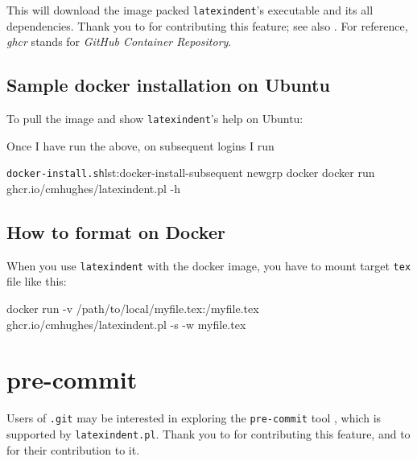 \documentclass[10pt]{article}
\begin{document}
  This will download the image packed \texttt{latexindent}'s executable and its all
  dependencies.  Thank you to \cite{eggplants} for contributing this
  feature; see also \cite{cmhughesio}. For reference, \emph{ghcr} stands for \emph{GitHub
  Container Repository}.

 \subsection{Sample docker installation on Ubuntu}
  To pull the image and show \texttt{latexindent}'s help on Ubuntu:


  Once I have run the above, on subsequent logins I run
  \begin{cmhlistings}[style=tcblatex,language=Bash]{\texttt{docker-install.sh}}{lst:docker-install-subsequent}
newgrp docker
docker run ghcr.io/cmhughes/latexindent.pl -h
\end{cmhlistings}

 \subsection{How to format on Docker}
  When you use \texttt{latexindent} with the docker image, you have to mount target \texttt{tex} file like this:

  \begin{commandshell}
docker run -v /path/to/local/myfile.tex:/myfile.tex ghcr.io/cmhughes/latexindent.pl -s -w myfile.tex
\end{commandshell}

 \section{pre-commit}

  Users of \texttt{.git} may be interested  in exploring the \texttt{pre-commit} tool \cite{pre-commithome}, which
  is supported by \texttt{latexindent.pl}. Thank you to \cite{tdegeusprecommit} for
  contributing this feature, and to \cite{holzhausprecommit} for their contribution to
  it.
\end{document}
